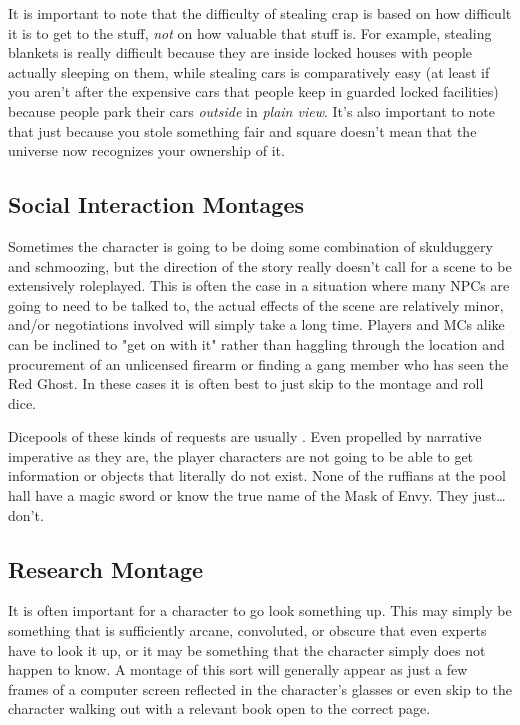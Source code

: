 It is important to note that the difficulty of stealing crap is based on how difficult it is to get to the stuff, \textit{not} on how valuable that stuff is. For example, stealing blankets is really difficult because they are inside locked houses with people actually sleeping on them, while stealing cars is comparatively easy (at least if you aren't after the expensive cars that people keep in guarded locked facilities) because people park their cars \textit{outside} in \textit{plain view}. It's also important to note that just because you stole something fair and square doesn't mean that the universe now recognizes your ownership of it.

\subsection{Social Interaction Montages}

Sometimes the character is going to be doing some combination of skulduggery and schmoozing, but the direction of the story really doesn't call for a scene to be extensively roleplayed. This is often the case in a situation where many NPCs are going to need to be talked to, the actual effects of the scene are relatively minor, and/or negotiations involved will simply take a long time. Players and MCs alike can be inclined to "get on with it" rather than haggling through the location and procurement of an unlicensed firearm or finding a gang member who has seen the Red Ghost. In these cases it is often best to just skip to the montage and roll dice.

Dicepools of these kinds of requests are usually . Even propelled by narrative imperative as they are, the player characters are not going to be able to get information or objects that literally do not exist. None of the ruffians at the pool hall have a magic sword or know the true name of the Mask of Envy. They just\ldots{} don't.

\subsection{Research Montage}

It is often important for a character to go look something up. This may simply be something that is sufficiently arcane, convoluted, or obscure that even experts have to look it up, or it may be something that the character simply does not happen to know. A montage of this sort will generally appear as just a few frames of a computer screen reflected in the character's glasses or even skip to the character walking out with a relevant book open to the correct page.

